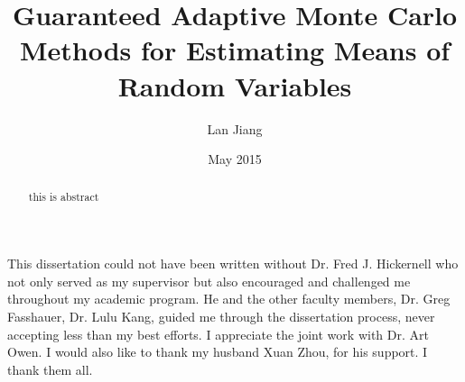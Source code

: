 \documentclass{iitthesis}
\begin{document}

\title{Guaranteed Adaptive Monte Carlo Methods for Estimating Means of Random Variables}
\author{Lan Jiang}
 
\date{May 2015}
\maketitle                %


\prelimpages         %


\begin{acknowledgement}     %
\par  This dissertation could not have been written without Dr. Fred
J. Hickernell who not only served as my supervisor but also
encouraged and challenged me throughout my academic program. He and
the other faculty members, Dr. Greg Fasshauer,
Dr. Lulu Kang, guided me through the dissertation process,
never accepting less than my best efforts. I appreciate the joint
work with Dr. Art Owen. I would
also like to thank my husband Xuan Zhou, for his support. I thank them all.
\end{acknowledgement}


\tableofcontents
 \clearpage

\listoftables

\clearpage

\listoffigures

\clearpage



\begin{abstract}           %
this is abstract
\end{abstract}
\textpages     %
\label{introduction}
\end{document}
